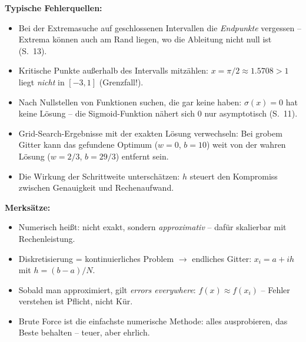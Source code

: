 \begin{merkbox}
\textbf{Typische Fehlerquellen:}
\begin{itemize}[itemsep=1pt]
  \item Bei der Extremasuche auf geschlossenen Intervallen die \emph{Endpunkte} vergessen -- Extrema können auch am Rand liegen, wo die Ableitung nicht null ist (S.~13).
  \item Kritische Punkte außerhalb des Intervalls mitzählen: $x = \pi/2 \approx 1.5708 > 1$ liegt \emph{nicht} in $[-3,1]$ (Grenzfall!).
  \item Nach Nullstellen von Funktionen suchen, die gar keine haben: $\sigma(x) = 0$ hat keine Lösung -- die Sigmoid-Funktion nähert sich $0$ nur asymptotisch (S.~11).
  \item Grid-Search-Ergebnisse mit der exakten Lösung verwechseln: Bei grobem Gitter kann das gefundene Optimum ($w=0$, $b=10$) weit von der wahren Lösung ($w=2/3$, $b=29/3$) entfernt sein.
  \item Die Wirkung der Schrittweite unterschätzen: $h$ steuert den Kompromiss zwischen Genauigkeit und Rechenaufwand.
\end{itemize}
\textbf{Merksätze:}
\begin{itemize}[itemsep=1pt]
  \item Numerisch heißt: nicht exakt, sondern \emph{approximativ} -- dafür skalierbar mit Rechenleistung.
  \item Diskretisierung = kontinuierliches Problem $\to$ endliches Gitter: $x_i = a + ih$ mit $h = (b-a)/N$.
  \item Sobald man approximiert, gilt \emph{errors everywhere}: $f(x) \approx f(x_i)$ -- Fehler verstehen ist Pflicht, nicht Kür.
  \item Brute Force ist die einfachste numerische Methode: alles ausprobieren, das Beste behalten -- teuer, aber ehrlich.
\end{itemize}
\end{merkbox}
